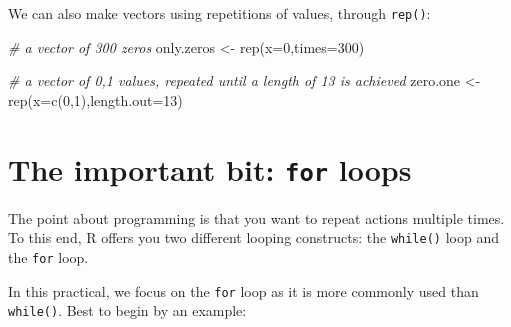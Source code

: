 \documentclass[
]{book}
\newenvironment{Shaded}{\begin{snugshade}}{\end{snugshade}}
\newcommand{\AttributeTok}[1]{\textcolor[rgb]{0.77,0.63,0.00}{#1}}
\newcommand{\CommentTok}[1]{\textcolor[rgb]{0.56,0.35,0.01}{\textit{#1}}}
\newcommand{\DecValTok}[1]{\textcolor[rgb]{0.00,0.00,0.81}{#1}}
\newcommand{\FunctionTok}[1]{\textcolor[rgb]{0.00,0.00,0.00}{#1}}
\newcommand{\NormalTok}[1]{#1}
\newcommand{\OtherTok}[1]{\textcolor[rgb]{0.56,0.35,0.01}{#1}}
\begin{document}
We can also make vectors using repetitions of values, through \texttt{rep()}:

\begin{Shaded}
\begin{Highlighting}[]
\CommentTok{\# a vector of 300 zeros}
\NormalTok{only.zeros }\OtherTok{\textless{}{-}} \FunctionTok{rep}\NormalTok{(}\AttributeTok{x=}\DecValTok{0}\NormalTok{,}\AttributeTok{times=}\DecValTok{300}\NormalTok{)}

\CommentTok{\# a vector of 0,1 values, repeated until a length of 13 is achieved}
\NormalTok{zero.one }\OtherTok{\textless{}{-}} \FunctionTok{rep}\NormalTok{(}\AttributeTok{x=}\FunctionTok{c}\NormalTok{(}\DecValTok{0}\NormalTok{,}\DecValTok{1}\NormalTok{),}\AttributeTok{length.out=}\DecValTok{13}\NormalTok{)}
\end{Highlighting}
\end{Shaded}

\hypertarget{the-important-bit-for-loops}{%
\section{\texorpdfstring{The important bit: \texttt{for} loops}{The important bit: for loops}}\label{the-important-bit-for-loops}}

The point about programming is that you want to repeat actions multiple times. To this end, R offers you two different looping constructs: the \texttt{while()} loop and the \texttt{for} loop.

In this practical, we focus on the \texttt{for} loop as it is more commonly used than \texttt{while()}. Best to begin by an example:
\end{document}
